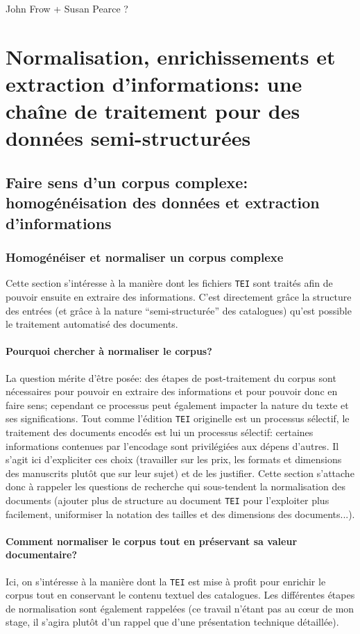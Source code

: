 \documentclass[a4paper, 12pt, twoside]{book}
\newcommand{\tei}{\texttt{TEI}}
\begin{document}
John Frow + Susan Pearce ?


\part{Normalisation, enrichissements et extraction d'informations: une chaîne de traitement pour des données semi-structurées}

\chapter{Faire sens d'un corpus complexe: homogénéisation des données et extraction d'informations}

\section{Homogénéiser et normaliser un corpus complexe}
Cette section s'intéresse à la manière dont les fichiers \tei{} sont traités afin de pouvoir ensuite en extraire des informations. C'est directement grâce la structure des entrées (et grâce à la nature \enquote{semi-structurée} des catalogues) qu'est possible le traitement automatisé des documents.

\subsection{Pourquoi chercher à normaliser le corpus?}
La question mérite d'être posée: des étapes de post-traitement du corpus sont nécessaires pour pouvoir en extraire des informations et pour pouvoir donc en faire sens; cependant ce processus peut également impacter la nature du texte et ses significations. Tout comme l'édition \tei{} originelle est un processus sélectif, le traitement des documents encodés est lui un processus sélectif: certaines informations contenues par l'encodage sont privilégiées aux dépens d'autres. Il s'agit ici d'expliciter ces choix (travailler sur les prix, les formats et dimensions des manuscrits plutôt que sur leur sujet) et de les justifier. Cette section s'attache donc à rappeler les questions de recherche qui sous-tendent la normalisation des documents (ajouter plus de structure au document \tei{} pour l'exploiter plus facilement, uniformiser la notation des tailles et des dimensions des documents...).

\subsection{Comment normaliser le corpus tout en préservant sa valeur documentaire?}
Ici, on s'intéresse à la manière dont la \tei{} est mise à profit pour enrichir le corpus tout en conservant le contenu textuel des catalogues. Les différentes étapes de normalisation sont également rappelées (ce travail n'étant pas au cœur de mon stage, il s'agira plutôt d'un rappel que d'une présentation technique détaillée).
\end{document}
